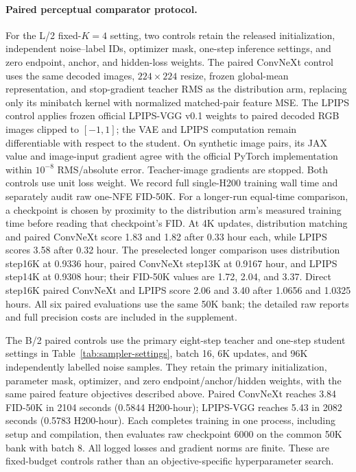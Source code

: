 \paragraph{Paired perceptual comparator protocol.}
For the L/2 fixed-$K=4$ setting, two controls retain the released
initialization, independent noise--label IDs, optimizer mask, one-step
inference settings, and zero endpoint, anchor, and hidden-loss weights. The
paired ConvNeXt control uses the same decoded images, $224\times224$
resize, frozen global-mean representation, and stop-gradient teacher RMS as
the distribution arm, replacing only its minibatch kernel with normalized
matched-pair feature MSE. The LPIPS control applies frozen official
LPIPS-VGG v0.1 weights to paired decoded RGB images clipped to $[-1,1]$;
the VAE and LPIPS computation remain differentiable with respect to the
student. On synthetic image pairs, its JAX value and image-input gradient
agree with the official PyTorch implementation within $10^{-8}$ RMS/absolute
error. Teacher-image gradients are stopped. Both controls use unit loss
weight. We record full single-H200 training wall time and separately audit
raw one-NFE FID-50K. For a longer-run equal-time comparison, a checkpoint
is chosen by proximity to the distribution arm's measured training time
before reading that checkpoint's FID.
At 4K updates, distribution matching and paired ConvNeXt score 1.83 and
1.82 after 0.33 hour each, while LPIPS scores 3.58 after 0.32 hour. The
preselected longer comparison uses distribution step16K at 0.9336 hour,
paired ConvNeXt step13K at 0.9167 hour, and LPIPS step14K at 0.9308 hour;
their FID-50K values are 1.72, 2.04, and 3.37. Direct step16K paired
ConvNeXt and LPIPS score 2.06 and 3.40 after 1.0656 and 1.0325 hours. All
six paired evaluations use the same 50K bank; the detailed raw reports and
full precision costs are included in the supplement.

The B/2 paired controls use the primary eight-step teacher and one-step
student settings in Table~\ref{tab:sampler-settings}, batch 16, 6K updates,
and 96K independently labelled noise samples. They retain the primary
initialization, parameter mask, optimizer, and zero endpoint/anchor/hidden
weights, with the same paired feature objectives described above.
Paired ConvNeXt reaches 3.84 FID-50K in 2104 seconds (0.5844 H200-hour);
LPIPS-VGG reaches 5.43 in 2082 seconds (0.5783 H200-hour).
Each completes training in one process, including setup and compilation,
then evaluates raw checkpoint 6000 on the common 50K bank with batch 8.
All logged losses and gradient norms are finite. These are fixed-budget
controls rather than an objective-specific hyperparameter search.

